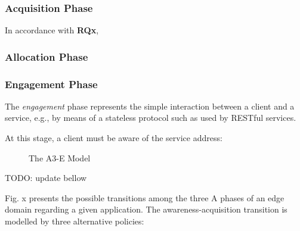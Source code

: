 \subsubsection{Acquisition Phase}\label{sec:A3-E-acquisition}

In accordance with \textbf{RQx}, 

\subsubsection{Allocation Phase}\label{sec:A3-E-allocation}

\subsubsection{Engagement Phase}\label{sec:A3-E-engagement}

The \textit{engagement} phase represents the simple interaction between a client and a service, e.g., by means of a stateless protocol such as used by RESTful services. 

At this stage, a client must be aware of the service address: 

\begin{figure}[htbp]
	\raggedright
	\hfill
	
	\hfill
	\caption{The A3-E Model} \label{fig:A3-E-model}
\end{figure}

TODO: update bellow

Fig. x presents the possible transitions among the three A phases of an edge domain regarding a given application. The awareness-acquisition transition is modelled by three alternative policies: 

